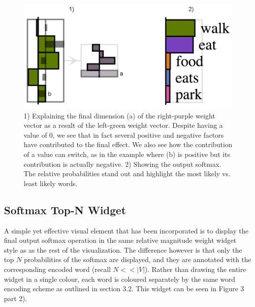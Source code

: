 \documentclass[journal]{vgtc}                %
\begin{document}
\begin{figure}[tb]
 \centering %
 \includegraphics[scale=.35]{weight_explain_and_softmax.png}
 \caption{1) Explaining the final dimension (a) of the right-purple weight vector as a result of the left-green weight vector.  Despite having a value of 0, we see that in fact several positive and negative factors have contributed to the final effect.  We also see how the contribution of a value can switch, as in the example where (b) is positive but its contribution is actually negative.  2) Showing the output softmax.  The relative probabilities stand out and highlight the most likely vs. least likely words.}
 \label{fig:weight_explain}
\end{figure}

\subsection{Softmax Top-N Widget}
A simple yet effective visual element that has been incorporated is to display the final output softmax operation in the same relative magnitude weight widget style as as the rest of the visualization.
The difference however is that only the top $N$ probabilities of the softmax are displayed, and they are annotated with the corresponding encoded word (recall $N << |V|$).
Rather than drawing the entire widget in a single colour, each word is coloured separately by the same word encoding scheme as outlined in section 3.2.
This widget can be seen in Figure 3 part 2).
\end{document}
